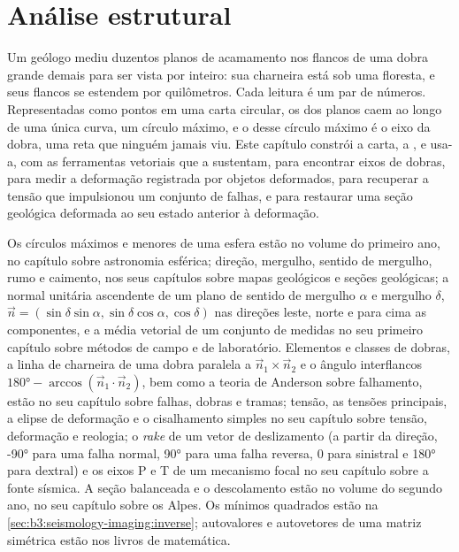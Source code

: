 \chapter{Análise estrutural}\label{ch:b3:structural-analysis}

Um geólogo mediu duzentos planos de acamamento nos flancos de uma dobra
grande demais para ser vista por inteiro: sua charneira está sob uma floresta, e seus flancos se estendem por
quilômetros. Cada leitura é um par de números. Representadas como pontos em uma carta circular,
os  dos planos caem ao longo de uma única curva, um círculo máximo, e
o  desse círculo máximo é o eixo da dobra, uma reta que ninguém
jamais viu. Este capítulo constrói a carta, a , e
usa-a, com as ferramentas vetoriais que a sustentam, para encontrar eixos de dobras, para medir a
deformação registrada por objetos deformados, para recuperar a tensão que impulsionou um conjunto de
falhas, e para restaurar uma seção geológica deformada ao seu estado anterior à
deformação.

\begin{recall}
Os círculos máximos e menores de uma esfera estão no volume do primeiro ano, no capítulo
sobre astronomia esférica; direção, mergulho, sentido de mergulho, rumo e caimento, nos seus capítulos
sobre mapas geológicos e seções geológicas; a normal unitária ascendente de um
plano de sentido de mergulho $\alpha$ e mergulho $\delta$, $\vec n = (\sin\delta
\sin\alpha, \sin\delta\cos\alpha, \cos\delta)$ nas direções leste, norte e para cima
as componentes, e a média vetorial de um conjunto de medidas no seu primeiro capítulo sobre
métodos de campo e de laboratório. Elementos e classes de dobras, a linha de charneira de uma
dobra paralela a $\vec n_1\times\vec n_2$ e o ângulo interflancos
$\ang{180} - \arccos(\vec n_1\cdot\vec n_2)$, bem como a teoria de Anderson sobre
falhamento, estão no seu capítulo sobre falhas, dobras e tramas; tensão, as
tensões principais, a elipse de deformação e o cisalhamento simples no seu capítulo sobre
tensão, deformação e reologia; o \textit{rake} de um vetor de deslizamento (a partir da direção,
\ang{-90} para uma falha normal, \ang{90} para uma falha reversa, 0 para sinistral e
\ang{180} para dextral) e os eixos P e T de um mecanismo focal no seu capítulo sobre
a fonte sísmica. A seção balanceada e o descolamento estão no
volume do segundo ano, no seu capítulo sobre os Alpes. Os mínimos quadrados estão
na \cref{sec:b3:seismology-imaging:inverse}; autovalores e autovetores de uma
matriz simétrica estão nos livros de matemática.
\end{recall}

